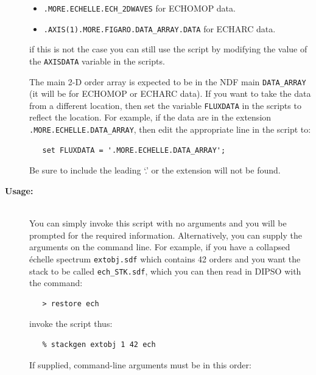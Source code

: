 \documentclass[twoside,11pt]{article}
\begin{document}
\begin{description}
\begin{itemize}

\item \verb+.MORE.ECHELLE.ECH_2DWAVES+ for ECHOMOP data.

\item \verb+.AXIS(1).MORE.FIGARO.DATA_ARRAY.DATA+ for ECHARC data.

\end{itemize}

     if this is not the case you can still use the script by modifying
     the value of the \verb+AXISDATA+ variable in the scripts.

     The main 2-D order array is expected to be in the NDF main
     \verb+DATA_ARRAY+ (it will be for ECHOMOP or ECHARC data).
     If you want to take the data from a different location, then
     set the variable \verb+FLUXDATA+ in the scripts to reflect
     the location.  For example, if the data are in the extension
     \verb+.MORE.ECHELLE.DATA_ARRAY+, then edit the appropriate line
     in the script to:

\begin{verbatim}
   set FLUXDATA = '.MORE.ECHELLE.DATA_ARRAY';
\end{verbatim}

     Be sure to include the leading `.' or the extension will not be
     found.

\item [{\bf Usage:}] \mbox{} \\
     You can simply invoke this script with no arguments and you
     will be prompted for the required information.  Alternatively,
     you can supply the arguments on the command line.  For example,
     if you have a collapsed \'{e}chelle spectrum \verb+extobj.sdf+ which
     contains 42 orders and you want the stack to be called
     {\tt ech\_STK.sdf}, which you can then read in DIPSO with the
     command:

\begin{verbatim}
   > restore ech
\end{verbatim}

     invoke the script thus:

\begin{verbatim}
   % stackgen extobj 1 42 ech
\end{verbatim}

     If supplied, command-line arguments must be in this order:

\begin{enumerate}


\end{enumerate}
\end{description}
\end{document}
